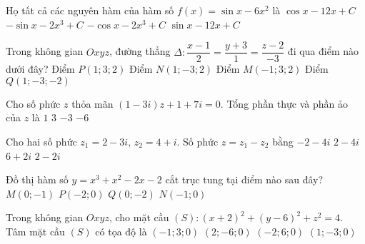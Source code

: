 \begin{ex}%
	Họ tất cả các nguyên hàm của hàm số $f(x)=\sin x-6x^2$ là
	\choice
	{$\cos x-12x+C$}
	{$-\sin x-2x^3+C$}
	{\True $-\cos x-2x^3+C$}
	{$\sin x-12x+C$}
\end{ex}
\begin{ex}%
	Trong không gian $Oxyz$, đường thẳng $\Delta\colon \dfrac{x-1}{2}=\dfrac{y+3}{1}=\dfrac{z-2}{-3}$ đi qua điểm nào dưới đây?
	\choice
	{Điểm $P(1;3;2)$}
	{\True Điểm $N(1;-3;2)$}
	{Điểm $M(-1;3;2)$}
	{Điểm $Q(1;-3;-2)$}
\end{ex}
\begin{ex}%
	Cho số phức $z$ thỏa mãn $(1-3i)z+1+7i=0$. Tổng phần thực và phần ảo của $z$ là
	\choice
	{\True $1$}
	{$3$}
	{$-3$}
	{$-6$}
\end{ex}
\begin{ex}%
	Cho hai số phức $z_1=2-3i$, $z_2=4+i$. Số phức $z=z_1-z_2$ bằng
	\choice
	{\True $-2-4i$}
	{$2-4i$}
	{$6+2i$}
	{$2-2i$}
\end{ex}
\begin{ex}%
	Đồ thị hàm số $y=x^3+x^2-2x-2$ cắt trục tung tại điểm nào sau đây?
	\choice
	{$M(0;-1)$}
	{$P(-2;0)$}
	{\True $Q(0;-2)$}
	{$N(-1;0)$}
\end{ex}
\begin{ex}%
	Trong không gian $Oxyz$, cho mặt cầu $(S)\colon (x+2)^2+(y-6)^2+z^2=4$. Tâm mặt cầu $(S)$ có tọa độ là
	\choice
	{$(-1;3;0)$}
	{$(2;-6;0)$}
	{\True $(-2;6;0)$}
	{$(1;-3;0)$}
\end{ex}
